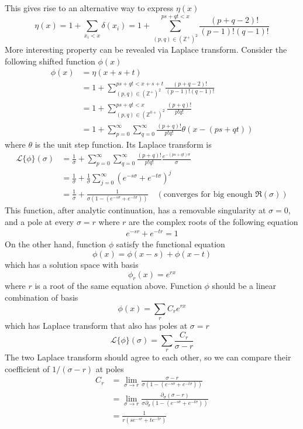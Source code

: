 \documentclass[]{article}
\begin{document}
This gives rise to an alternative way to express $\eta(x)$
\[
	\eta(x) = 1 + \sum_{x_i < x} \delta(x_i) = 1 + \sum_{(p,q)\in(\mathbb{Z}^+)^2}^{ps+qt < x} \frac{(p+q-2)!}{(p-1)!(q-1)!}
\]
More interesting property can be revealed via Laplace transform. Consider the following shifted function $\phi(x)$
\begin{align*}
	\phi(x) &= \eta(x + s +t) \\
	&= 1 + \sum_{(p,q)\in(\mathbb{Z}^+)^2}^{ps+qt < x+s+t} \frac{(p+q-2)!}{(p-1)!(q-1)!}\\
	&= 1 + \sum_{(p,q)\in(\mathbb{Z}^{0+})^2}^{ps+qt < x} \frac{(p+q)!}{p!q!}\\
	&= 1 + \sum_{p=0}^{\infty}\sum_{q=0}^{\infty} \frac{(p+q)!}{p!q!} \theta(x - (ps + qt))
\end{align*}
where $\theta$ is the unit step function. Its Laplace transform is 
\begin{align*}
\mathcal{L}\{\phi\}(\sigma) &= \frac{1}{\sigma} + \sum_{p=0}^{\infty}\sum_{q=0}^{\infty} \frac{(p+q)!}{p!q!} \frac{e^{-(ps+qt)\sigma}}{\sigma} \\
&= \frac{1}{\sigma} + \frac{1}{\sigma} \sum_{j=0}^{\infty} (e^{-s\sigma} + e^{-t\sigma})^j\\
&= \frac{1}{\sigma} + \frac{1}{\sigma(1- (e^{-s\sigma} + e^{-t\sigma}))} \quad(\text{converges for big enough }\mathfrak{R}(\sigma))
\end{align*}
This function, after analytic continuation, has a removable singularity at $\sigma = 0$, and a pole at every $\sigma = r$ where $r$ are the complex roots of the following equation
\begin{align*}
e^{-sr} + e^{-tr} = 1
\end{align*}
On the other hand, function $\phi$ satisfy the functional equation
\[
\phi(x) = \phi(x - s) + \phi(x - t)
\]
which has a solution space with basis
\[
\phi_r(x) = e^{r x}
\]
where $r$ is a root of the same equation above. Function $\phi$ should be a linear combination of basis
\[
\phi(x) = \sum_{r} C_r e^{r x}
\]
which has Laplace transform that also has poles at $\sigma = r$
\[
\mathcal{L}\{\phi\}(\sigma) = \sum_{r} \frac{C_r}{\sigma - r}
\]
The two Laplace transform should agree to each other, so we can compare their coefficient of $1/(\sigma - r)$ at poles
\begin{align*}
C_r &= \lim_{\sigma\to r} \frac{\sigma - r}{\sigma(1- (e^{-s\sigma} + e^{-t\sigma}))} \\
&= \lim_{\sigma\to r} \frac{\partial_\sigma(\sigma - r)}{\sigma\partial_\sigma(1- (e^{-s\sigma} + e^{-t\sigma}))} \\
    &= \frac{1}{r(s e^{-sr} + t e^{-tr})}
\end{align*}
\end{document}
